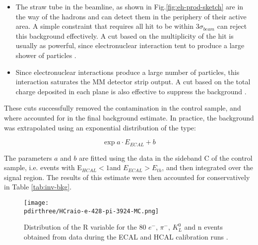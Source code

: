 \begin{itemize}
\item The straw tube in the beamline, as shown in Fig.\ref{fig:eh-prod-sketch} are in the way of the hadrons and can detect them in the periphery of their active area. A simple constraint that requires all hit to be within 3$\sigma_{beam}$ can reject this background effectively. A cut based on the multiplicity of the hit is usually as powerful, since electronuclear interaction tent to produce a large shower of particles \cite{pdegen-thesis}.
\item Since electronuclear interactions produce a large number of particles, this interaction saturates the MM detector strip output. A cut based on the total charge deposited in each plane is also effective to suppress the background \cite{na64-invisible-cuts}.
\end{itemize}

These cuts successfully removed the contamination in the control sample, and where accounted for in the final background estimate. In practice, the background was extrapolated using an exponential distribution of the type:

\begin{equation}
  \label{eq:bkg-extrapolation}
  \exp{a \cdot E_{ECAL} + b}
\end{equation}

The parameters $a$ and $b$ are fitted using the data in the sideband C of the control sample, i.e. events with E$_{HCAL}<1$\gev and $E_{ECAL}>E_{th}$, and then integrated over the signal region. The results of this estimate were then accounted for conservatively in Table \ref{tab:inv-bkg}.

\begin{figure}[bht!]
  \centering
  \texttt{[image: \\pdirthree/HCraio-e-428-pi-3924-MC.png]}
  \caption[R value comparison]{Distribution of the R variable for the 80 \gev $e^-$, $\pi^-$, $K_L^0$ and n events obtained from data during the ECAL and HCAL calibration runs \cite{Banerjee:2020fue}.}
  \label{fig:R-comp}
\end{figure}


